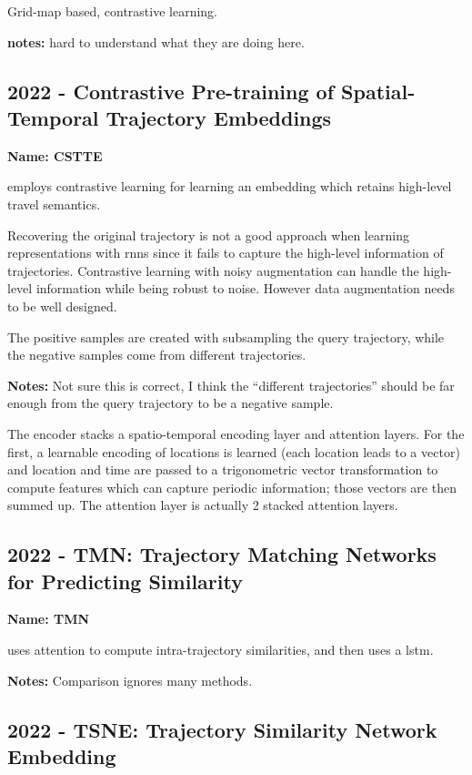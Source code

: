 \cite{ahmed2022deep} Grid-map based, contrastive learning. 

\textbf{notes:} hard to understand what they are doing here.

\subsection*{2022 - Contrastive Pre-training of Spatial-Temporal Trajectory Embeddings}

\textbf{Name: CSTTE}

\cite{lin2022contrastive} employs contrastive learning for learning an embedding which retains high-level travel semantics.

Recovering the original trajectory is not a good approach when learning representations with \glspl{rnn} since it fails to capture the high-level information of trajectories. Contrastive learning with noisy augmentation can handle the high-level information while being robust to noise. However data augmentation needs to be well designed. 

The positive samples are created with subsampling the query trajectory, while the negative samples come from different trajectories.

\textbf{Notes:} Not sure this is correct, I think the ``different trajectories'' should be far enough from the query trajectory to be a negative sample.

The encoder stacks a spatio-temporal encoding layer and attention layers. For the first, a learnable encoding of locations is learned (each location leads to a vector) and location and time are passed to a trigonometric vector transformation to compute features which can capture periodic information; those vectors are then summed up. The attention layer is actually 2 stacked attention layers.


\subsection*{2022 - TMN: Trajectory Matching Networks for Predicting Similarity}

\textbf{Name: TMN}

\cite{yang2022tmn} uses attention to compute intra-trajectory similarities, and then uses a \gls{lstm}.

\textbf{Notes:} Comparison ignores many methods.

\subsection*{2022 - TSNE: Trajectory Similarity Network Embedding}

